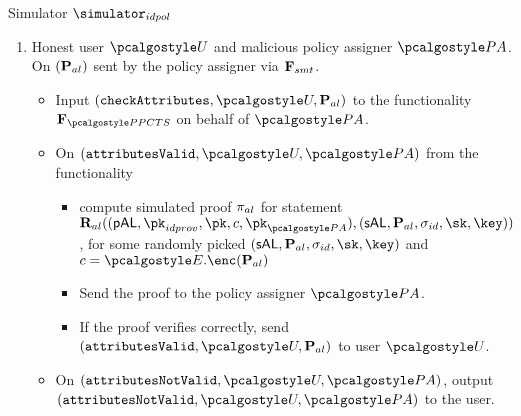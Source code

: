 \documentclass[runningheads,10pt]{llncs}
\numberwithin{equation}{section}
\begin{document}
\begin{simbox}{Simulator $\simulator_{idpol}$}
\begin{enumerate}
  \item Honest user $\user$ and malicious policy assigner $\polas$. On
    $(\mathbf{P}_{al})$ sent by the policy assigner via $\mathbf{F}_{{smt}}$.
    \begin{itemize}
    \item Input $(\checkAttributes, \user, \alpolicy)$ to the functionality
      $\func{\PPCTS}$ on behalf of $\polas$.
    \item On $(\attributesValid, \user, \polas)$ from the functionality
      \begin{itemize}
      \item compute simulated proof $\mathsf{\pi}_{al}$ for statement
        $\REL_{al} ((\pAL, \pk_{idprov}, \pk, c, \pk_{\polas}), (\sAL, \alpolicy,
        \signature_{id}, \sk, \key))$, for some randomly picked
        $(\sAL, \alpolicy, \signature_{id}, \sk, \key)$ and
        $c = \ENC.\enc(\alpolicy)$
      \item Send the proof to the policy assigner $\polas$.
      \item If the proof verifies correctly, send
        $(\attributesValid, \user, \alpolicy)$ to user $\user$.
      \end{itemize}
      \item On $(\attributesNotValid, \user, \polas)$, output $(\attributesNotValid,
        \user, \polas)$ to the user.
      \end{itemize}


\end{enumerate}
\end{simbox}
\end{document}
